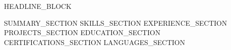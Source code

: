\documentclass[10pt,a4paper,sans]{moderncv}
\begin{document}
\makecvtitle
HEADLINE_BLOCK

SUMMARY_SECTION
SKILLS_SECTION
EXPERIENCE_SECTION
PROJECTS_SECTION
EDUCATION_SECTION
CERTIFICATIONS_SECTION
LANGUAGES_SECTION
\end{document}
